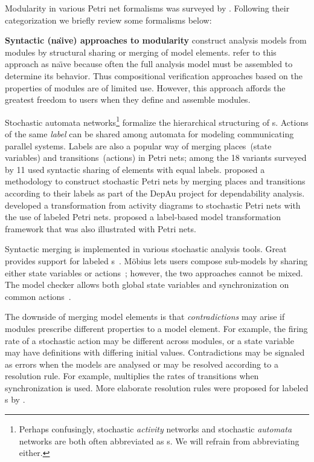 Modularity in various Petri net formalisms was surveyed by \citet{Marechal12modular}. Following their categorization we briefly review some formalisms below:

\newpara \textbf{Syntactic (na\"\i ve) approaches to modularity} construct analysis models from modules by structural sharing or merging of model elements. \citet{Marechal12modular} refer to this approach as na\"\i ve because often the full analysis model must be assembled to determine its behavior. Thus compositional verification approaches based on the properties of modules are of limited use. However, this approach affords the greatest freedom to users when they define and assemble modules.

Stochastic automata networks\footnote{Perhaps confusingly, stochastic \emph{activity} networks and stochastic \emph{automata} networks are both often abbreviated as s. We will refrain from abbreviating either.} formalize the hierarchical structuring of s. Actions of the same \emph{label} can be shared among automata for modeling communicating parallel systems. Labels are also a popular way of merging places~(state variables) and transitions~(actions) in Petri nets; among the 18 variants surveyed by \citet{Marechal12modular} 11 used syntactic sharing of elements with equal labels. 
\citet{Bernardi03building} proposed a methodology to construct stochastic Petri nets by merging places and transitions according to their labels as part of the DepAu project for dependability analysis. \citet{Lopez04activitydiagram} developed a transformation from  activity diagrams to stochastic Petri nets with the use of labeled Petri nets. \citet{Kuhne09explicit} proposed a label-based model transformation framework that was also illustrated with Petri nets.

Syntactic merging is implemented in various stochastic analysis tools. Great provides support for labeled s~\citep{Bernardi00compositionality}. M{\"o}bius lets users compose sub-models by sharing either state variables or actions~\citep{Courtney09mobius}; however, the two approaches cannot be mixed. The  model checker allows both global state variables and synchronization on common actions~\citep{Kwiatkowska11prism}.

The downside of merging model elements is that \emph{contradictions} may arise if modules prescribe different properties to a model element. For example, the firing rate of a stochastic action may be different across modules, or a state variable may have definitions with differing initial values. Contradictions may be signaled as errors when the models are analysed or may be resolved according to a resolution rule. For example,  multiplies the rates of transitions when synchronization is used. More elaborate resolution rules were proposed for labeled s by \citet[Section~2.2.3]{Bernardi03thesis}.

